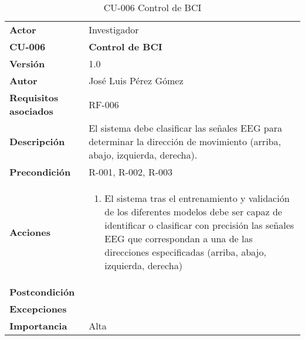 \begin{table}[p]
	\centering
	\begin{tabularx}{\linewidth}{ p{} p{} }
		\toprule
		\textbf{Actor}              & Investigador    \\
		\textbf{CU-006}    & \textbf{Control de BCI}\\
		\toprule
		\textbf{Versión}              & 1.0    \\
		\textbf{Autor}                & José Luis Pérez Gómez \\
		\textbf{Requisitos asociados} & RF-006 \\
		\textbf{Descripción}          & El sistema debe clasificar las señales EEG para determinar la dirección de movimiento (arriba, abajo, izquierda, derecha).\\
		\textbf{Precondición}         & R-001, R-002, R-003\\
		\textbf{Acciones}             &
		\begin{enumerate}
			\def\labelenumi{\arabic{enumi}.}
			\tightlist
			\item El sistema tras el entrenamiento y validación de los diferentes modelos debe ser capaz de identificar o clasificar con precisión las señales EEG que correspondan a una de las direcciones especificadas (arriba, abajo, izquierda, derecha)
			
		\end{enumerate}\\
		\textbf{Postcondición}        & \\
		\textbf{Excepciones}          &  \\
		\textbf{Importancia}          & Alta \\
		\bottomrule
	\end{tabularx}
	\caption{CU-006 Control de BCI}
\end{table}


